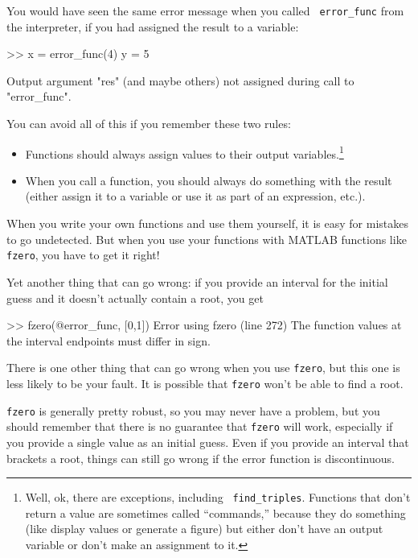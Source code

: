 \documentclass[
]{book}
\numberwithin{Answer}{chapter}
\numberwithin{Exercise}{chapter}
\begin{document}
You would have seen the same error message when you called {\tt
error\_func} from the interpreter, if you had assigned the result
to a variable:

\begin{code}
>> x = error_func(4)
y = 5

Output argument "res" (and maybe others) not assigned during
call to "error_func".
\end{code}

You can avoid all of this if you remember these two rules:

\begin{itemize}

\item Functions should always assign values to their output
variables.\footnote{Well, ok, there are exceptions, including {\tt
find\_triples}. Functions that don't return a value are sometimes
called ``commands,'' because they do something (like display
values or generate a figure) but either don't have an output
variable or don't make an assignment to it.}

\item When you call a function, you should always do something with
the result (either assign it to a variable or use it as part of an
expression, etc.).

\end{itemize}

When you write your own functions and use them yourself, it is easy
for mistakes to go undetected.  But when you use your functions with
MATLAB functions like {\tt fzero}, you have to get it right!

Yet another thing that can go wrong: if you provide an interval for the
initial guess and it doesn't actually contain a root, you get

\begin{code}
>> fzero(@error_func, [0,1])
Error using fzero (line 272)
The function values at the interval endpoints must differ in sign.
\end{code}

There is one other thing that can go wrong when you use {\tt fzero}, but
this one is less likely to be your fault.  It is possible that {\tt fzero}
won't be able to find a root.

{\tt fzero} is generally pretty robust, so you may never have a problem, but you should remember that there is no guarantee that {\tt fzero} will work, especially if you provide a single value as an initial guess.  Even if you provide an interval that brackets a root, things can still go wrong if the error function is discontinuous.
\end{document}
